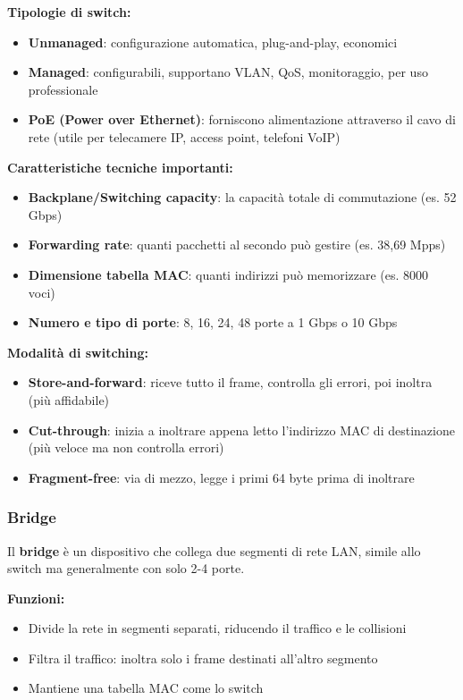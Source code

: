 \documentclass[12pt,a4paper]{article}
\begin{document}
\textbf{Tipologie di switch:}
\begin{itemize}
    \item \textbf{Unmanaged}: configurazione automatica, plug-and-play, economici
    \item \textbf{Managed}: configurabili, supportano VLAN, QoS, monitoraggio, per uso professionale
    \item \textbf{PoE (Power over Ethernet)}: forniscono alimentazione attraverso il cavo di rete (utile per telecamere IP, access point, telefoni VoIP)
\end{itemize}

\textbf{Caratteristiche tecniche importanti:}
\begin{itemize}
    \item \textbf{Backplane/Switching capacity}: la capacità totale di commutazione (es. 52 Gbps)
    \item \textbf{Forwarding rate}: quanti pacchetti al secondo può gestire (es. 38,69 Mpps)
    \item \textbf{Dimensione tabella MAC}: quanti indirizzi può memorizzare (es. 8000 voci)
    \item \textbf{Numero e tipo di porte}: 8, 16, 24, 48 porte a 1 Gbps o 10 Gbps
\end{itemize}

\textbf{Modalità di switching:}
\begin{itemize}
    \item \textbf{Store-and-forward}: riceve tutto il frame, controlla gli errori, poi inoltra (più affidabile)
    \item \textbf{Cut-through}: inizia a inoltrare appena letto l'indirizzo MAC di destinazione (più veloce ma non controlla errori)
    \item \textbf{Fragment-free}: via di mezzo, legge i primi 64 byte prima di inoltrare
\end{itemize}

\subsubsection{Bridge}

Il \textbf{bridge} è un dispositivo che collega due segmenti di rete LAN, simile allo switch ma generalmente con solo 2-4 porte.

\textbf{Funzioni:}
\begin{itemize}
    \item Divide la rete in segmenti separati, riducendo il traffico e le collisioni
    \item Filtra il traffico: inoltra solo i frame destinati all'altro segmento
    \item Mantiene una tabella MAC come lo switch
\end{itemize}
\end{document}

